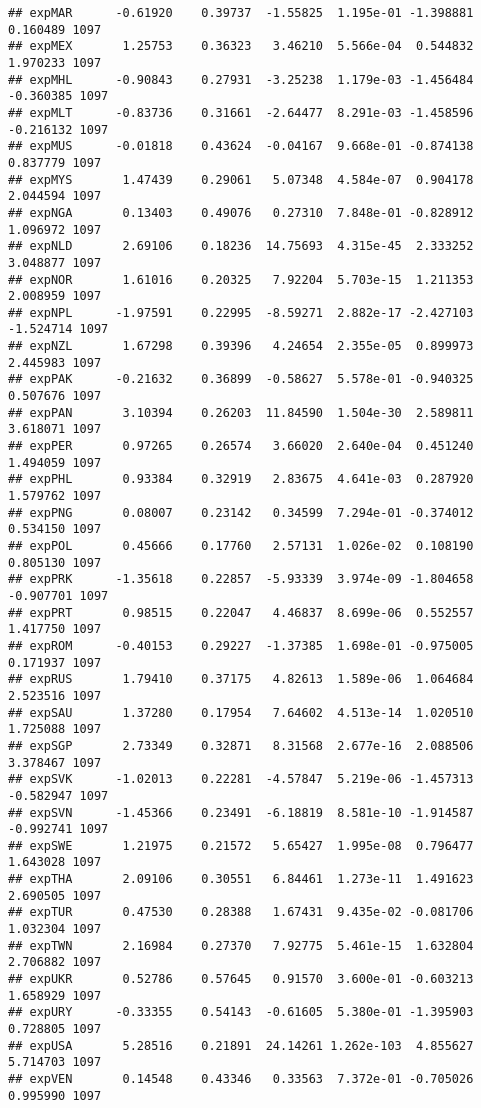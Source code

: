 \documentclass[
]{article}
\begin{document}
\begin{verbatim}
## expMAR      -0.61920    0.39737  -1.55825  1.195e-01 -1.398881  0.160489 1097
## expMEX       1.25753    0.36323   3.46210  5.566e-04  0.544832  1.970233 1097
## expMHL      -0.90843    0.27931  -3.25238  1.179e-03 -1.456484 -0.360385 1097
## expMLT      -0.83736    0.31661  -2.64477  8.291e-03 -1.458596 -0.216132 1097
## expMUS      -0.01818    0.43624  -0.04167  9.668e-01 -0.874138  0.837779 1097
## expMYS       1.47439    0.29061   5.07348  4.584e-07  0.904178  2.044594 1097
## expNGA       0.13403    0.49076   0.27310  7.848e-01 -0.828912  1.096972 1097
## expNLD       2.69106    0.18236  14.75693  4.315e-45  2.333252  3.048877 1097
## expNOR       1.61016    0.20325   7.92204  5.703e-15  1.211353  2.008959 1097
## expNPL      -1.97591    0.22995  -8.59271  2.882e-17 -2.427103 -1.524714 1097
## expNZL       1.67298    0.39396   4.24654  2.355e-05  0.899973  2.445983 1097
## expPAK      -0.21632    0.36899  -0.58627  5.578e-01 -0.940325  0.507676 1097
## expPAN       3.10394    0.26203  11.84590  1.504e-30  2.589811  3.618071 1097
## expPER       0.97265    0.26574   3.66020  2.640e-04  0.451240  1.494059 1097
## expPHL       0.93384    0.32919   2.83675  4.641e-03  0.287920  1.579762 1097
## expPNG       0.08007    0.23142   0.34599  7.294e-01 -0.374012  0.534150 1097
## expPOL       0.45666    0.17760   2.57131  1.026e-02  0.108190  0.805130 1097
## expPRK      -1.35618    0.22857  -5.93339  3.974e-09 -1.804658 -0.907701 1097
## expPRT       0.98515    0.22047   4.46837  8.699e-06  0.552557  1.417750 1097
## expROM      -0.40153    0.29227  -1.37385  1.698e-01 -0.975005  0.171937 1097
## expRUS       1.79410    0.37175   4.82613  1.589e-06  1.064684  2.523516 1097
## expSAU       1.37280    0.17954   7.64602  4.513e-14  1.020510  1.725088 1097
## expSGP       2.73349    0.32871   8.31568  2.677e-16  2.088506  3.378467 1097
## expSVK      -1.02013    0.22281  -4.57847  5.219e-06 -1.457313 -0.582947 1097
## expSVN      -1.45366    0.23491  -6.18819  8.581e-10 -1.914587 -0.992741 1097
## expSWE       1.21975    0.21572   5.65427  1.995e-08  0.796477  1.643028 1097
## expTHA       2.09106    0.30551   6.84461  1.273e-11  1.491623  2.690505 1097
## expTUR       0.47530    0.28388   1.67431  9.435e-02 -0.081706  1.032304 1097
## expTWN       2.16984    0.27370   7.92775  5.461e-15  1.632804  2.706882 1097
## expUKR       0.52786    0.57645   0.91570  3.600e-01 -0.603213  1.658929 1097
## expURY      -0.33355    0.54143  -0.61605  5.380e-01 -1.395903  0.728805 1097
## expUSA       5.28516    0.21891  24.14261 1.262e-103  4.855627  5.714703 1097
## expVEN       0.14548    0.43346   0.33563  7.372e-01 -0.705026  0.995990 1097

\end{verbatim}
\end{document}
